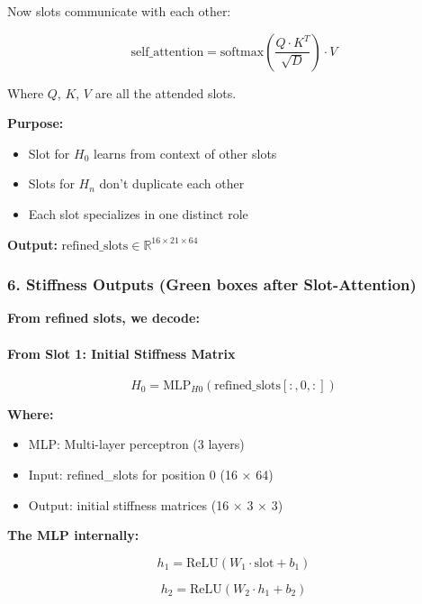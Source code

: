 \documentclass[11pt,a4paper]{article}
\begin{document}
Now slots communicate with each other:

\begin{equation}
\text{self\_attention} = \text{softmax}\left(\frac{Q \cdot K^T}{\sqrt{D}}\right) \cdot V
\end{equation}

Where $Q$, $K$, $V$ are all the attended slots.

\textbf{Purpose:}
\begin{itemize}
  \item Slot for $H_0$ learns from context of other slots
  \item Slots for $H_n$ don't duplicate each other
  \item Each slot specializes in one distinct role
\end{itemize}

\textbf{Output:} $\text{refined\_slots} \in \mathbb{R}^{16 \times 21 \times 64}$

\subsubsection{6. Stiffness Outputs (Green boxes after Slot-Attention)}

\textbf{From refined slots, we decode:}

\paragraph{From Slot 1: Initial Stiffness Matrix}

\begin{equation}
H_0 = \text{MLP}_{H0}(\text{refined\_slots}[:, 0, :])
\end{equation}

\textbf{Where:}
\begin{itemize}
  \item MLP: Multi-layer perceptron (3 layers)
  \item Input: refined\_slots for position 0 (16 × 64)
  \item Output: initial stiffness matrices (16 × 3 × 3)
\end{itemize}

\textbf{The MLP internally:}

\begin{equation}
h_1 = \text{ReLU}(W_1 \cdot \text{slot} + b_1)
\end{equation}

\begin{equation}
h_2 = \text{ReLU}(W_2 \cdot h_1 + b_2)
\end{equation}
\end{document}

